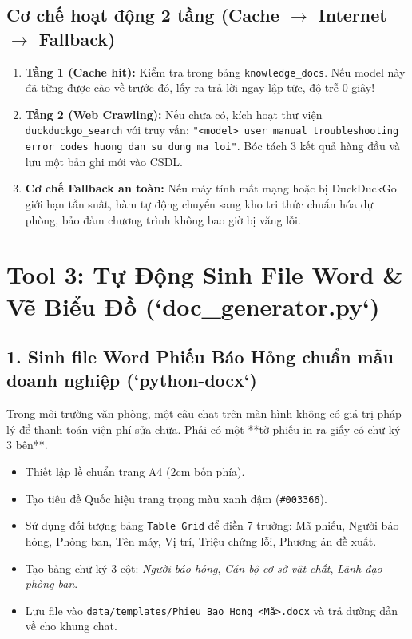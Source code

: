 \documentclass[11pt,a4paper]{article}
\begin{document}
\subsection{Cơ chế hoạt động 2 tầng (Cache $\rightarrow$ Internet $\rightarrow$ Fallback)}
\begin{enumerate}
    \item \textbf{Tầng 1 (Cache hit):} Kiểm tra trong bảng \texttt{knowledge\_docs}. Nếu model này đã từng được cào về trước đó, lấy ra trả lời ngay lập tức, độ trễ 0 giây!
    \item \textbf{Tầng 2 (Web Crawling):} Nếu chưa có, kích hoạt thư viện \texttt{duckduckgo\_search} với truy vấn:  
    \texttt{"<model> user manual troubleshooting error codes huong dan su dung ma loi"}.  
    Bóc tách 3 kết quả hàng đầu và lưu một bản ghi mới vào CSDL.
    \item \textbf{Cơ chế Fallback an toàn:} Nếu máy tính mất mạng hoặc bị DuckDuckGo giới hạn tần suất, hàm tự động chuyển sang kho tri thức chuẩn hóa dự phòng, bảo đảm chương trình không bao giờ bị văng lỗi.
\end{enumerate}

\section{Tool 3: Tự Động Sinh File Word \& Vẽ Biểu Đồ (`doc\_generator.py`)}

\subsection{1. Sinh file Word Phiếu Báo Hỏng chuẩn mẫu doanh nghiệp (`python-docx`)}
Trong môi trường văn phòng, một câu chat trên màn hình không có giá trị pháp lý để thanh toán viện phí sửa chữa. Phải có một **tờ phiếu in ra giấy có chữ ký 3 bên**.
\begin{itemize}
    \item Thiết lập lề chuẩn trang A4 (2cm bốn phía).
    \item Tạo tiêu đề Quốc hiệu trang trọng màu xanh đậm (\texttt{\#003366}).
    \item Sử dụng đối tượng bảng \texttt{Table Grid} để điền 7 trường: Mã phiếu, Người báo hỏng, Phòng ban, Tên máy, Vị trí, Triệu chứng lỗi, Phương án đề xuất.
    \item Tạo bảng chữ ký 3 cột: \textit{Người báo hỏng}, \textit{Cán bộ cơ sở vật chất}, \textit{Lãnh đạo phòng ban}.
    \item Lưu file vào \texttt{data/templates/Phieu\_Bao\_Hong\_<Mã>.docx} và trả đường dẫn về cho khung chat.
\end{itemize}
\end{document}
